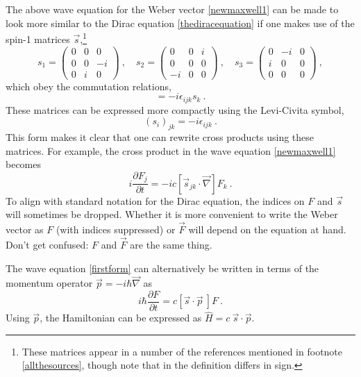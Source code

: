 \documentclass[12pt,secnumarabic,amsmath,amssymb,balancelastpage,nofootinbib]{article}
\newcommand{\del}[0]{\ensuremath{\vec{\nabla}}}
\begin{document}
The above wave equation for the Weber vector \eqref{newmaxwell1} can be made to look more similar to the Dirac equation \eqref{thediracequation} if one makes use of the spin-1 matrices $\vec{s}$,\footnote{These matrices appear in a number of the references mentioned in footnote \ref{allthesources}, though note that in \citet{good1957} the definition differs in sign.}
\begin{equation}
s_1=\begin{pmatrix}
0 & 0 & 0 \\
0 & 0 & -i \\
0 & i & 0
\end{pmatrix}\ ,
\quad
s_2=\begin{pmatrix}
0 & 0 & i \\
0 & 0 & 0 \\
-i & 0 & 0
\end{pmatrix}\ ,
\quad
s_3=\begin{pmatrix}
0 & -i & 0 \\
i & 0 & 0 \\
0 & 0 & 0
\end{pmatrix}\ ,
\end{equation}
which obey the commutation relations,
\begin{equation}
[s_i,s_j]=-i \epsilon_{ijk}s_k\ .
\end{equation}
These matrices can be expressed more compactly using the Levi-Civita symbol,
\begin{equation}
(s_i)_{jk}=-i \epsilon_{ijk}
\ .
\label{compactformk}
\end{equation}
This form makes it clear that one can rewrite cross products using these matrices.  For example, the cross product in the wave equation \eqref{newmaxwell1} becomes
\begin{equation}
i \frac{\partial F_j}{\partial t}  = - i c [\vec{s}_{jk}\cdot \del] F_k
\ .
\label{firstform}
\end{equation} 
To align with standard notation for the Dirac equation, the indices on $F$ and $\vec{s}$ will sometimes be dropped.  Whether it is more convenient to write the Weber vector as $F$ (with indices suppressed) or $\vec{F}$ will depend on the equation at hand.  Don't get confused: $F$ and $\vec{F}$ are the same thing.





The wave equation \eqref{firstform} can alternatively be written in terms of the momentum operator $\vec{p}=-i\hbar\del$ as
\begin{equation}
i \hbar \frac{\partial F}{\partial t} = c [\vec{s}\cdot \vec{p}\:] F
\ .
\label{diracform}
\end{equation}
Using $\vec{p}$, the Hamiltonian can be expressed as $\widehat{H}= c\: \vec{s}\cdot \vec{p}$.
\end{document}
